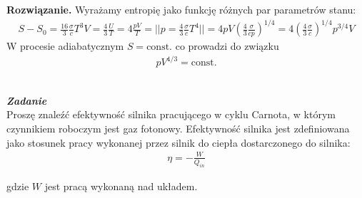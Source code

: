 \documentclass[11pt,a4paper]{article}
\newcounter{zadanie}\newcommand{\zadanie}[1][]{\addtocounter{zadanie}{1} ~\\ {\bf \emph{Zadanie \arabic{zadanie} #1 }} \\}
\newenvironment{solution}{\vspace{1cm} \par\textbf{Rozwiązanie.} \vspace{1cm}}{}
\begin{document}
\begin{solution}
Wyrażamy entropię jako funkcję różnych par parametrów stanu:
\begin{align*}
	S - S_0 = \frac{16}{3} \frac{\sigma }{c} T^3 V = 
  \frac{4}{3} \frac{U}{T} = 
  4 \frac{p V}{T} = || p = \frac{4}{3} \frac{\sigma}{c} T^4 || =
  4 p V \left(\frac{4}{3}\frac{\sigma}{c p} \right)^{1/4} =
  4\left(\frac{4}{3} \frac{\sigma}{c} \right)^{1/4}p^{3/4}V
\end{align*}
W procesie adiabatycznym $S=\text{const.}$ co prowadzi do związku
\begin{align*}
    pV^{4/3}=\text{const.}
\end{align*}

\newpage   
\end{solution}
\zadanie[]

Proszę znaleźć efektywność silnika pracującego w cyklu Carnota, w którym 
czynnikiem roboczym jest gaz fotonowy. Efektywność silnika jest zdefiniowana jako 
stosunek pracy wykonanej przez silnik do ciepła dostarczonego do silnika:
\begin{align*}
  \eta = -\frac{W}{Q_{in}}
\end{align*}

gdzie $W$ jest pracą wykonaną nad układem.
\end{document}
